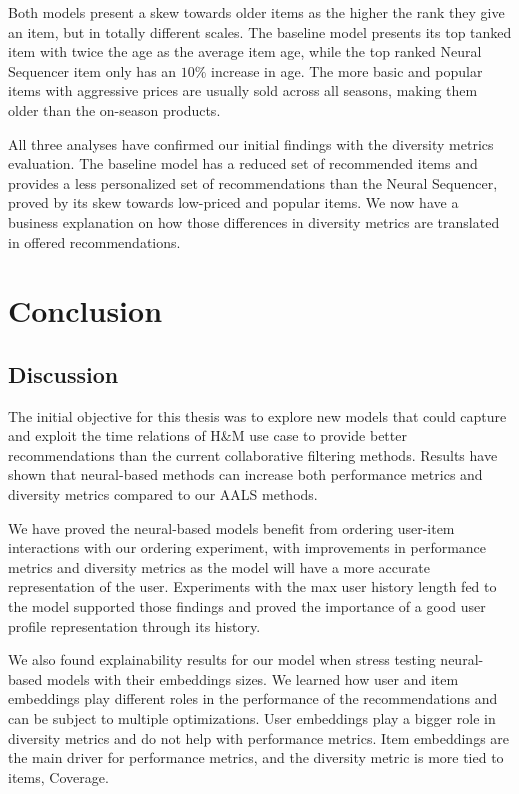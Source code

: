 \documentclass{kththesis}
\begin{document}
Both models present a skew towards older items as the higher the rank they give an item, but in totally different scales. The baseline model presents its top tanked item with twice the age as the average item age, while the top ranked Neural Sequencer item only has an $10\%$ increase in age. The more basic and popular items with aggressive prices are usually sold across all seasons, making them older than the on-season products. 

All three analyses have confirmed our initial findings with the diversity metrics evaluation. The baseline model has a reduced set of recommended items and provides a less personalized set of recommendations than the Neural Sequencer, proved by its skew towards low-priced and popular items. We now have a business explanation on how those differences in diversity metrics are translated in offered recommendations.

\chapter{Conclusion}
\section{Discussion}
The initial objective for this thesis was to explore new models that could capture and exploit the time relations of H\&M use case to provide better recommendations than the current collaborative filtering methods. Results have shown that neural-based methods can increase both performance metrics and diversity metrics compared to our AALS methods.

We have proved the neural-based models benefit from ordering user-item interactions with our ordering experiment, with improvements in performance metrics and diversity metrics as the model will have a more accurate representation of the user. Experiments with the max user history length fed to the model supported those findings and proved the importance of a good user profile representation through its history. 

We also found explainability results for our model when stress testing neural-based models with their embeddings sizes. We learned how user and item embeddings play different roles in the performance of the recommendations and can be subject to multiple optimizations. User embeddings play a bigger role in diversity metrics and do not help with performance metrics. Item embeddings are the main driver for performance metrics, and the diversity metric is more tied to items, Coverage.
\end{document}

